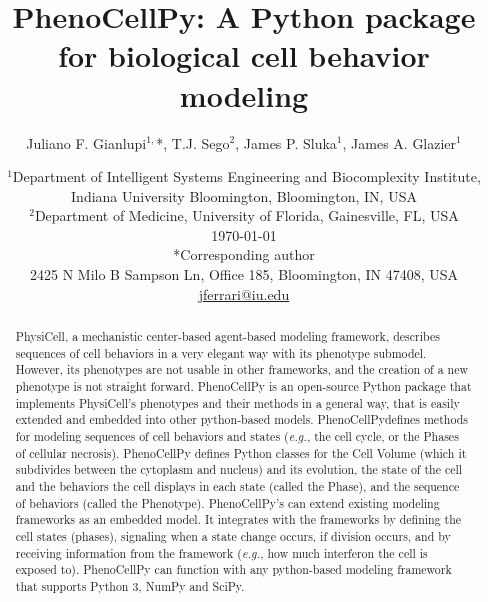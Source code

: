 \documentclass{article}
\title{PhenoCellPy: A Python package for biological cell behavior modeling}
\author{Juliano F. Gianlupi$^{1 ,}$*, T.J. Sego$^2$, James P. Sluka$^1$, James A. Glazier$^1$}
\date{$^{1 }$Department of Intelligent Systems Engineering and Biocomplexity Institute, Indiana University Bloomington, Bloomington, IN, USA\\\vspace{.75em}$^2$Department of Medicine, University of Florida, Gainesville, FL, USA\\\vspace{1.5em}\today\\\vspace{1.5em}*Corresponding author\\2425 N Milo B Sampson Ln, Office 185, Bloomington, IN 47408, USA\\\vspace{.75em}\href{mailto:jferrari@iu.edu}{jferrari@iu.edu}}
\renewcommand{\textit}[1]{\emph{#1}}
\newcommand{\pcp}{PhenoCellPy}
\newcommand{\pcps}{\pcp\space}
\begin{document}
\maketitle
\vspace{-2em}
\begin{abstract}
    PhysiCell, a mechanistic center-based agent-based modeling framework, describes sequences of cell behaviors in a very elegant way with its phenotype submodel. However, its phenotypes are not usable in other frameworks, and the creation of a new phenotype is not straight forward.
    PhenoCellPy is an open-source Python package that implements PhysiCell's phenotypes and their methods in a general way, that is easily extended and embedded into other python-based models. \pcps defines methods for modeling sequences of cell behaviors and states (\textit{e.g.}, the cell cycle, or the Phases of cellular necrosis). PhenoCellPy defines Python classes for the Cell Volume (which it subdivides between the cytoplasm and nucleus) and its evolution, the state of the cell and the behaviors the cell displays in each state (called the Phase), and the sequence of behaviors (called the Phenotype). PhenoCellPy's can extend existing modeling frameworks as an embedded model. It integrates with the frameworks by defining the cell states (phases), signaling when a state change occurs, if division occurs, and by receiving information from the framework (\textit{e.g.}, how much interferon the cell is exposed to).
    PhenoCellPy can function with any python-based modeling framework that supports Python 3, NumPy and SciPy. 
\end{abstract}

% 


\printbibliography[heading=bibintoc,title={References}]





\end{document}
